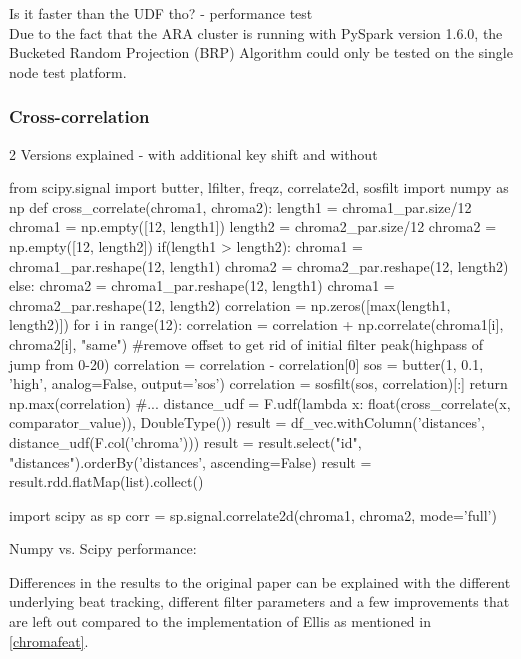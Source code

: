 Is it faster than the UDF tho? - performance test\\
Due to the fact that the ARA cluster is running with PySpark version 1.6.0, the Bucketed Random Projection (BRP) Algorithm could only be tested on the single node test platform. 

\subsubsection{Cross-correlation}

2 Versions explained - with additional key shift and without\\

\begin{pythonCode}[frame=single,label={lst:corr},caption={cross-correlation numpy},captionpos=b]
from scipy.signal import butter, lfilter, freqz, correlate2d, sosfilt
import numpy as np
def cross_correlate(chroma1, chroma2):
    length1 = chroma1_par.size/12
    chroma1 = np.empty([12, length1])
    length2 = chroma2_par.size/12
    chroma2 = np.empty([12, length2])
    if(length1 > length2):
        chroma1 = chroma1_par.reshape(12, length1)
        chroma2 = chroma2_par.reshape(12, length2)
    else:
        chroma2 = chroma1_par.reshape(12, length1)
        chroma1 = chroma2_par.reshape(12, length2)      
    correlation = np.zeros([max(length1, length2)])
    for i in range(12):
        correlation = correlation + np.correlate(chroma1[i], chroma2[i], "same")    
    #remove offset to get rid of initial filter peak(highpass of jump from 0-20)
    correlation = correlation - correlation[0]
    sos = butter(1, 0.1, 'high', analog=False, output='sos')
    correlation = sosfilt(sos, correlation)[:]
    return np.max(correlation)
#...
distance_udf = F.udf(lambda x: float(cross_correlate(x, comparator_value)), DoubleType())
result = df_vec.withColumn('distances', distance_udf(F.col('chroma')))
result = result.select("id", "distances").orderBy('distances', ascending=False)
result = result.rdd.flatMap(list).collect()
\end{pythonCode}

\begin{pythonCode}[frame=single,label={lst:corr},caption={cross-correlation scipy},captionpos=b]
import scipy as sp
corr = sp.signal.correlate2d(chroma1, chroma2, mode='full')
\end{pythonCode}

Numpy vs. Scipy performance: 

\noindent Differences in the results to the original paper can be explained with the different underlying beat tracking, different filter parameters and a few improvements that are left out compared to the implementation of Ellis \cite{cover802} as mentioned in \ref{chromafeat}.

